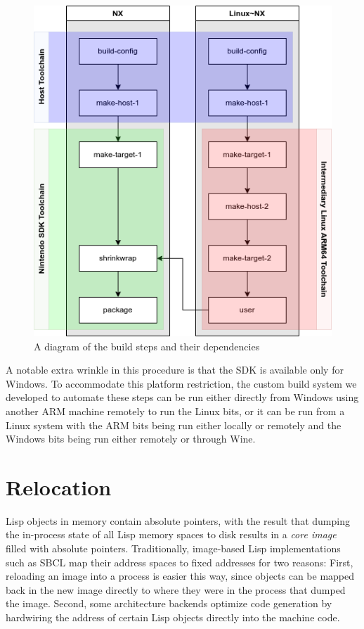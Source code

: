 \documentclass[format=sigconf]{acmart}
\begin{document}
\begin{figure}[h]
  \centering
  \includegraphics[width=\linewidth]{build.png}
  \caption{A diagram of the build steps and their dependencies}
\end{figure}

A notable extra wrinkle in this procedure is that the SDK is available only for Windows. To accommodate this platform restriction, the custom build system we developed to automate these steps can be run either directly from Windows using another ARM machine remotely to run the Linux bits, or it can be run from a Linux system with the ARM bits being run either locally or remotely and the Windows bits being run either remotely or through Wine\cite{amstadt1994wine}.

\section{Relocation}\label{relocation}
Lisp objects in memory contain absolute pointers, with the result that dumping the in-process state of all Lisp memory spaces to disk results in a \textit{core image} filled with absolute pointers. Traditionally, image-based Lisp implementations such as SBCL map their address spaces to fixed addresses for two reasons: First, reloading an image into a process is easier this way, since objects can be mapped back in the new image directly to where they were in the process that dumped the image. Second, some architecture backends optimize code generation by hardwiring the address of certain Lisp objects directly into the machine code.
\end{document}
